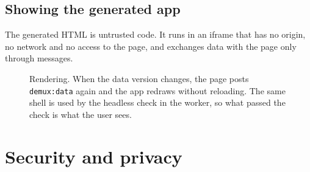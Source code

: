 \documentclass[10pt,a4paper]{article}
\newcommand{\code}[1]{\texttt{\small #1}}
\newcommand{\actor}[4]{%
  \node[actor] (#1) at (#2,0) {#3};
  \draw[life] (#2,-0.33) -- (#2,-#4);}
\newcommand{\msg}[4]{\draw[msg] (#1 |- 0,-#3) -- node[lab,above]{#4} (#2 |- 0,-#3);}
\newcommand{\ret}[4]{\draw[ret] (#1 |- 0,-#3) -- node[lab,above]{#4} (#2 |- 0,-#3);}
\newcommand{\self}[3]{\draw[msg] ($(#1 |- 0,-#2)$) -- ++(0.55,0) -- ++(0,-0.32) -- ++(-0.55,0);
  \node[lab,anchor=west] at ($(#1 |- 0,-#2)+(0.6,-0.16)$) {#3};}
\begin{document}
\subsection{Showing the generated app}

The generated HTML is untrusted code. It runs in an iframe that has no origin, no network and
no access to the page, and exchanges data with the page only through messages.

\begin{figure}[H]
\centering
{}
\caption{Rendering. When the data version changes, the page posts \code{demux:data} again and
the app redraws without reloading. The same shell is used by the headless check in the worker,
so what passed the check is what the user sees.}
\end{figure}

\section{Security and privacy}
\label{sec:security}
\end{document}
